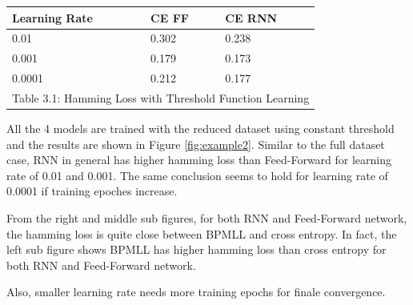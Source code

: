 \documentclass[11pt]{article}
\begin{document}
\vspace{0.45cm}
 \begin{tabular}[c]{| p{} | p{} |p{} |}
\hline
        \textbf{Learning Rate}  & \textbf{CE FF} & \textbf{CE RNN}  \\
        \hline \hline
         0.01 & 0.302 & 0.238 \\
        \hline
         0.001 & 0.179 & 0.173 \\
        \hline
         0.0001 & 0.212 & 0.177 \\
        \hline \hline
        \multicolumn{3}{|c|}{Table 3.1: Hamming Loss with Threshold Function Learning} \\
        \hline     
\end{tabular}
\vspace{0.45cm}

All the 4 models are trained with the reduced dataset using constant threshold and the results are shown in Figure \ref{fig:example2}. Similar to the full dataset case, RNN in general has higher hamming loss than Feed-Forward for learning rate of 0.01 and 0.001. The same conclusion seems to hold for learning rate of 0.0001 if training epoches increase. 

From the right and middle sub figures, for both RNN and Feed-Forward network, the hamming loss is quite close between BPMLL and cross entropy. In fact, the left sub figure shows BPMLL has higher hamming loss than cross entropy for both RNN and Feed-Forward network.

Also, smaller learning rate needs more training epochs for finale convergence. 
\end{document}
